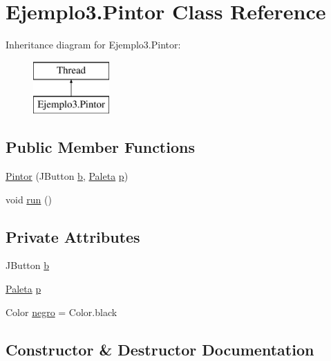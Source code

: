 \hypertarget{class_ejemplo3_1_1_pintor}{}\section{Ejemplo3.\+Pintor Class Reference}
\label{class_ejemplo3_1_1_pintor}
Inheritance diagram for Ejemplo3.\+Pintor\+:\begin{figure}[H]
\begin{center}
\leavevmode
\includegraphics[height=2.000000cm]{class_ejemplo3_1_1_pintor}
\end{center}
\end{figure}
\subsection*{Public Member Functions}
\begin{DoxyCompactItemize}
\item 
\mbox{\hyperlink{class_ejemplo3_1_1_pintor_aba92e473b60ce2c21d78c52a28f066bf}{Pintor}} (J\+Button \mbox{\hyperlink{class_ejemplo3_1_1_pintor_a6d590d2c7f652707e7ba3fc0f54e51e3}{b}}, \mbox{\hyperlink{class_ejemplo3_1_1_paleta}{Paleta}} \mbox{\hyperlink{class_ejemplo3_1_1_pintor_a737a9003af55c987971eb40fd24efbf9}{p}})
\item 
void \mbox{\hyperlink{class_ejemplo3_1_1_pintor_a7f939a9eb41a274e0b70803fd52992ab}{run}} ()
\end{DoxyCompactItemize}
\subsection*{Private Attributes}
\begin{DoxyCompactItemize}
\item 
J\+Button \mbox{\hyperlink{class_ejemplo3_1_1_pintor_a6d590d2c7f652707e7ba3fc0f54e51e3}{b}}
\item 
\mbox{\hyperlink{class_ejemplo3_1_1_paleta}{Paleta}} \mbox{\hyperlink{class_ejemplo3_1_1_pintor_a737a9003af55c987971eb40fd24efbf9}{p}}
\item 
Color \mbox{\hyperlink{class_ejemplo3_1_1_pintor_a34e84683fa94d2f17767c7313c02565e}{negro}} = Color.\+black
\end{DoxyCompactItemize}


\subsection{Constructor \& Destructor Documentation}
\mbox{\label{class_ejemplo3_1_1_pintor_aba92e473b60ce2c21d78c52a28f066bf}} 
